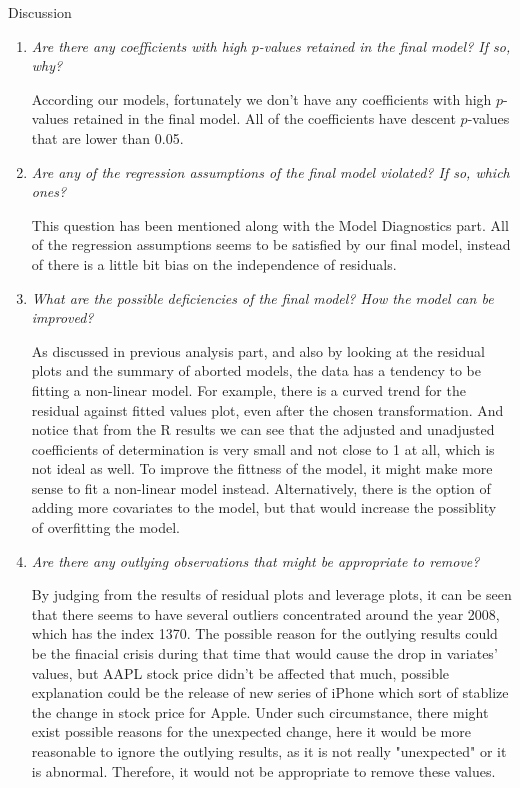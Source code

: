 \documentclass[]{article}
\begin{document}
\begin{section}{Discussion}
\begin{enumerate}
\item{}
\textit {Are there any coefficients with high $p$-values retained in the final model? If so, why?}

According our models, fortunately we don't have any coefficients with high $p$-values retained in the final model. All of the coefficients have descent $p$-values that are lower than 0.05.

\item{}
\textit {Are any of the regression assumptions of the final model violated? If so, which ones?}

This question has been mentioned along with the Model Diagnostics part. All of the regression assumptions seems to be satisfied by our final model, instead of there is a little bit bias on the independence of residuals.

\item{}
\textit {What are the possible deficiencies of the final model? How the model can be improved?}

As discussed in previous analysis part, and also by looking at the residual plots and the summary of aborted models, the data has a tendency to be fitting a non-linear model. For example, there is a curved trend for the residual against fitted values plot, even after the chosen transformation. And notice that from the R results we can see that the adjusted and unadjusted coefficients of determination is very small and not close to 1 at all, which is not ideal as well. To improve the fittness of the model, it might make more sense to fit a non-linear model instead. Alternatively, there is the option of adding more covariates to the model, but that would increase the possiblity of overfitting the model.  

\item{}
\textit {Are there any outlying observations that might be appropriate to remove?}

By judging from the results of residual plots and leverage plots, it can be seen that there seems to have several outliers concentrated around the year 2008, which has the index 1370. The possible reason for the outlying results could be the finacial crisis during that time that would cause the drop in variates' values, but AAPL stock price didn't be affected that much, possible explanation could be the release of new series of iPhone which sort of stablize the change in stock price for Apple. Under such circumstance, there might exist possible reasons for the unexpected change, here it would be more reasonable to ignore the outlying results, as it is not really "unexpected" or it is abnormal. Therefore, it would not be appropriate to remove these values.

\end{enumerate}

\end{section}
\end{document}
